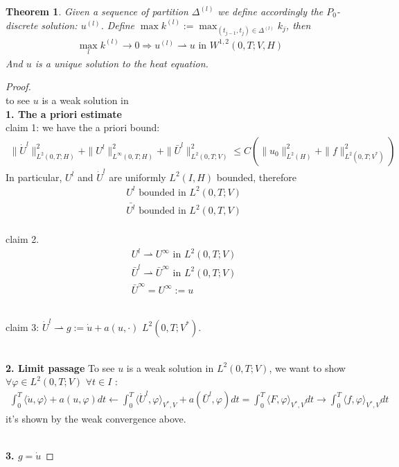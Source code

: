 \documentclass[a4paper,12pt,oneside,fleqn]{book}
\newtheorem{theorem}{Theorem}[section]
\theoremstyle{definition}
\theoremstyle{remark}
\begin{document}
\begin{theorem}
Given a sequence of partition $\Delta^{(l)}$ we define accordingly the $P_0$-discrete solution: $u^{(l)}$. Define $\max k^{(l)}:= \max_{(t_{j-1}, t_j) \in \Delta^{(l)}}k_j$, then 
\begin{align*}
	\max_l k^{(l)} \rightarrow 0 \Rightarrow u^{(l)} \rightharpoonup u \text{ in } W^{1, 2}(0, T; V, H)
\end{align*}
And $u$ is a unique solution to the heat equation. 
\end{theorem}
\begin{proof}\quad\\
to see $u$ is a weak solution in   \\
\textbf{1. The a priori estimate}
\quad\\
claim 1: we have the a priori bound:
\begin{align*}
	\|\dot{U}^l\|_{L^2(0, T; H)}^2 + \|U^l\|_{L^\infty(0, T; H)}^2 + \|\bar{U}^l\|_{L^2(0, T;V)}^2 \le C( \|u_0\|_{L^2(H)}^2 + \|f\|_{L^2(0, T;V^*)}^2)
\end{align*}
In particular, $U^l$ and $\dot{U}^l$ are uniformly $L^2(I, H)$ bounded, therefore
\begin{align*}
	& U^l \text{ bounded in } L^2(0, T;V)\\
	& \bar{U^l} \text{ bounded in } L^2(0, T, V)
\end{align*}
\quad\\
claim 2. 
\begin{align*}
	& U^l \rightharpoonup U^\infty \text{ in } L^2(0, T;V)\\
	& \bar{U}^l \rightharpoonup \bar{U}^\infty \text{ in } L^2(0, T; V)\\
	& \bar{U}^\infty = U^\infty := u
\end{align*}

\quad\\
claim 3: $\dot{U}^l \rightharpoonup g:=  \dot{u} + a(u, \cdot)$  $L^2(0, T; V^*)$. 

\quad\\
\textbf{2. Limit passage}
To see $u$ is a weak solution in $L^2(0, T;V)$, we want to show $\forall \varphi \in L^2(0, T; V) $ $\forall t \in I$ :
\begin{align*}
	 \int_0^T \langle \dot{u}, \varphi \rangle + a(u, \varphi) dt   \leftarrow \int_0^T \langle \dot{U}^l, \varphi \rangle_{V^*, V} +  a(\bar{U}^l, \varphi ) dt = \int_0^T \langle F, \varphi \rangle_{V^*, V} dt  \rightarrow \int_0^T \langle f, \varphi \rangle_{V^*, V} dt
\end{align*}
it's shown by the weak convergence above.
	
	
\quad\\
\textbf{3. $g = \dot{u}$}

\end{proof}
\end{document}

